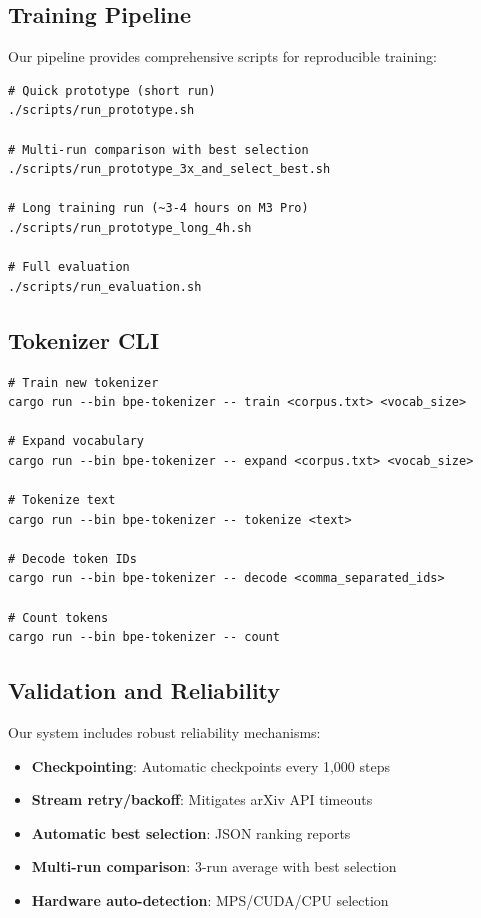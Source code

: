 \documentclass[11pt,a4paper]{article}
\theoremstyle{plain}
\theoremstyle{definition}
\begin{document}
\subsection{Training Pipeline}

Our pipeline provides comprehensive scripts for reproducible training:

\begin{lstlisting}[caption=Training Pipeline Commands]
# Quick prototype (short run)
./scripts/run_prototype.sh

# Multi-run comparison with best selection
./scripts/run_prototype_3x_and_select_best.sh

# Long training run (~3-4 hours on M3 Pro)
./scripts/run_prototype_long_4h.sh

# Full evaluation
./scripts/run_evaluation.sh
\end{lstlisting}

\subsection{Tokenizer CLI}

\begin{lstlisting}[caption=Tokenizer Command-Line Interface]
# Train new tokenizer
cargo run --bin bpe-tokenizer -- train <corpus.txt> <vocab_size>

# Expand vocabulary
cargo run --bin bpe-tokenizer -- expand <corpus.txt> <vocab_size>

# Tokenize text
cargo run --bin bpe-tokenizer -- tokenize <text>

# Decode token IDs
cargo run --bin bpe-tokenizer -- decode <comma_separated_ids>

# Count tokens
cargo run --bin bpe-tokenizer -- count
\end{lstlisting}

\subsection{Validation and Reliability}

Our system includes robust reliability mechanisms:

\begin{itemize}[leftmargin=*,itemsep=2pt]
    \item \textbf{Checkpointing}: Automatic checkpoints every 1,000 steps
    \item \textbf{Stream retry/backoff}: Mitigates arXiv API timeouts
    \item \textbf{Automatic best selection}: JSON ranking reports
    \item \textbf{Multi-run comparison}: 3-run average with best selection
    \item \textbf{Hardware auto-detection}: MPS/CUDA/CPU selection
\end{itemize}
\end{document}
